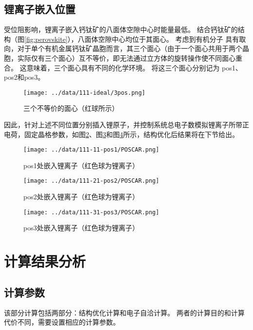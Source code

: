 \subsection{锂离子嵌入位置}

受位阻影响，锂离子嵌入钙钛矿的八面体空隙中心时能量最低。
结合钙钛矿的结构（图\ref{fig:perovskite}），八面体空隙中心均位于其面心。
考虑到有机分子  具有取向，对于单个有机金属钙钛矿晶胞而言，其三个面心（由于一个面心共用于两个晶胞，实际仅有三个面心）互不等价，即无法通过立方体的旋转操作使不同面心重合。
这意味着，三个面心具有不同的化学环境。
将这三个面心分别记为 pos1、pos2和pos3。

\begin{figure}[htbp]
    \centering
    \texttt{[image: ../data/111-ideal/3pos.png]}
    \caption{三个不等价的面心（红球所示）}
    \label{fig:3pos}
\end{figure}


因此，针对上述不同位置分别插入锂原子，并控制系统总电子数模拟锂离子所带正电荷，固定晶格参数，如图\ref{fig:pos1-poscar}、图\ref{fig:pos2-poscar}和图\ref{fig:pos3-poscar}所示，结构优化后结果将在下节给出。

\begin{figure}[htbp]
    \centering
    \texttt{[image: ../data/111-11-pos1/POSCAR.png]}
    \caption{pos1处嵌入锂离子（红色球为锂离子）}
    \label{fig:pos1-poscar}
\end{figure}
\begin{figure}[htbp]
    \centering
    \texttt{[image: ../data/111-21-pos2/POSCAR.png]}
    \caption{pos2处嵌入锂离子（红色球为锂离子）}
    \label{fig:pos2-poscar}
\end{figure}
\begin{figure}[htbp]
    \centering
    \texttt{[image: ../data/111-31-pos3/POSCAR.png]}
    \caption{pos3处嵌入锂离子（红色球为锂离子）}
    \label{fig:pos3-poscar}
\end{figure}



\section{计算结果分析}

\subsection{计算参数}

该部分计算包括两部分：结构优化计算和电子自洽计算。
两者的计算目的和计算代价不同，需要设置相应的计算参数。

